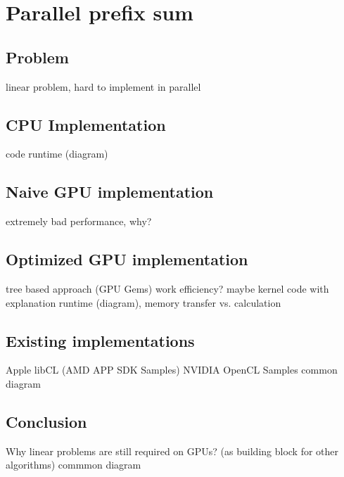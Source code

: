 \section{Parallel prefix sum}
\label{sec:prefix_sum}

\subsection{Problem}
linear problem, hard to implement in parallel

\subsection{CPU Implementation}
code
runtime (diagram)

\subsection{Naive GPU implementation}
extremely bad performance, why?

\subsection{Optimized GPU implementation}
tree based approach (GPU Gems) work efficiency?
maybe kernel code with explanation
runtime (diagram), memory transfer vs. calculation

\subsection{Existing implementations}
Apple
libCL
(AMD APP SDK Samples)
NVIDIA OpenCL Samples
common diagram

\subsection{Conclusion}
Why linear problems are still required on GPUs? (as building block for other algorithms)
commmon diagram
